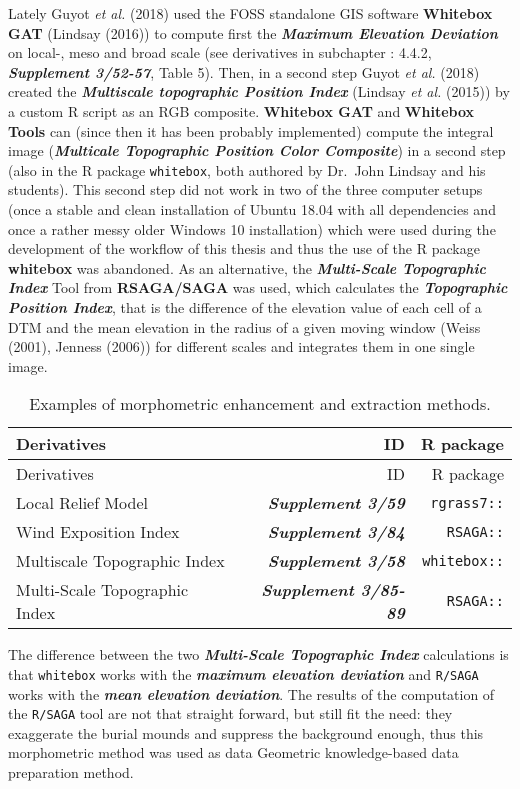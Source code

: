 \documentclass[
  12pt,
]{article}
\begin{document}
Lately Guyot \emph{et al.} (2018) used the FOSS standalone GIS software \textbf{Whitebox GAT} (Lindsay (2016)) to compute first the \textbf{\emph{Maximum Elevation Deviation}} on local-, meso and broad scale (see derivatives in subchapter : 4.4.2, \textbf{\emph{Supplement 3/52-57}}, Table 5). Then, in a second step Guyot \emph{et al.} (2018) created the \textbf{\emph{Multiscale topographic Position Index}} (Lindsay \emph{et al.} (2015)) by a custom R script as an RGB composite. \textbf{Whitebox GAT} and \textbf{Whitebox Tools} can (since then it has been probably implemented) compute the integral image (\textbf{\emph{Multicale Topographic Position Color Composite}}) in a second step (also in the R package \texttt{whitebox}, both authored by Dr.~John Lindsay and his students). This second step did not work in two of the three computer setups (once a stable and clean installation of Ubuntu 18.04 with all dependencies and once a rather messy older Windows 10 installation) which were used during the development of the workflow of this thesis and thus the use of the R package \textbf{whitebox} was abandoned.
As an alternative, the \textbf{\emph{Multi-Scale Topographic Index}} Tool from \textbf{RSAGA/SAGA} was used, which calculates the \textbf{\emph{Topographic Position Index}}, that is the difference of the elevation value of each cell of a DTM and the mean elevation in the radius of a given moving window (Weiss (2001), Jenness (2006)) for different scales and integrates them in one single image.

\begin{longtable}[]{@{}lrr@{}}
\caption{Examples of morphometric enhancement and extraction methods.}\tabularnewline
\toprule
Derivatives & ID & R package \\
\midrule
\endfirsthead
\toprule
Derivatives & ID & R package \\
\midrule
\endhead
Local Relief Model & \textbf{\emph{Supplement 3/59}} & \texttt{rgrass7::} \\
Wind Exposition Index & \textbf{\emph{Supplement 3/84}} & \texttt{RSAGA::} \\
Multiscale Topographic Index & \textbf{\emph{Supplement 3/58}} & \texttt{whitebox::} \\
Multi-Scale Topographic Index & \textbf{\emph{Supplement 3/85-89}} & \texttt{RSAGA::} \\
\bottomrule
\end{longtable}

The difference between the two \textbf{\emph{Multi-Scale Topographic Index}} calculations is that \texttt{whitebox} works with the \textbf{\emph{maximum elevation deviation}} and \texttt{R/SAGA} works with the \textbf{\emph{mean elevation deviation}}. The results of the computation of the \texttt{R/SAGA} tool are not that straight forward, but still fit the need: they exaggerate the burial mounds and suppress the background enough, thus this morphometric method was used as data Geometric knowledge-based data preparation method.
\end{document}
